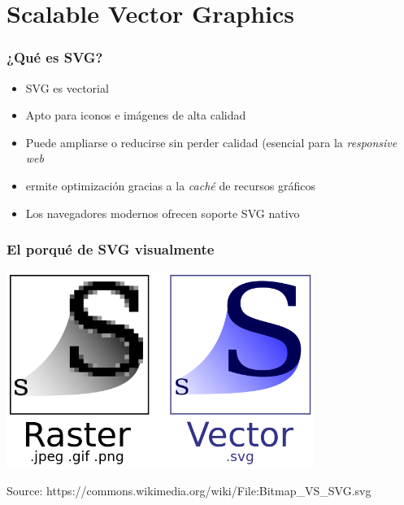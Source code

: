 \section{Scalable Vector Graphics}


\begin{frame}
\frametitle{¿Qué es SVG?}

\begin{itemize}
   \item SVG es vectorial
   \item Apto para iconos e imágenes de alta calidad
   \item Puede ampliarse o reducirse sin perder calidad (esencial para la \emph{responsive web}
   \item ermite optimización gracias a la \emph{caché} de recursos gráficos
   \item Los navegadores modernos ofrecen soporte SVG nativo
\end{itemize}

\end{frame}



\begin{frame}
\frametitle{El porqué de SVG visualmente}

\begin{center}
  \includegraphics[width=10cm]{figs/svg.png}
\end{center}


\begin{flushright}
{\tiny
Source: https://commons.wikimedia.org/wiki/File:Bitmap\_VS\_SVG.svg
}
\end{flushright}

\end{frame}


